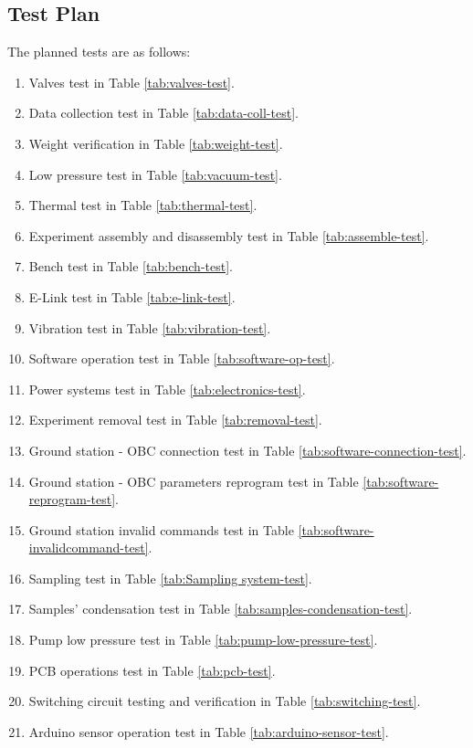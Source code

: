 \pagebreak
\subsection{Test Plan}

The planned tests are as follows:

\begin{enumerate}
    \item Valves test in Table \ref{tab:valves-test}.
    \item Data collection test in Table \ref{tab:data-coll-test}.
    \item Weight verification in Table \ref{tab:weight-test}.
    \item Low pressure test in Table \ref{tab:vacuum-test}.
    \item Thermal test in Table \ref{tab:thermal-test}.
    \item Experiment assembly and disassembly test in Table \ref{tab:assemble-test}.
    \item Bench test in Table \ref{tab:bench-test}.
    \item E-Link test in Table \ref{tab:e-link-test}.
    \item Vibration test in Table \ref{tab:vibration-test}.
    \item Software operation test in Table \ref{tab:software-op-test}.
    \item Power systems test in Table \ref{tab:electronics-test}.
    \item Experiment removal test in Table \ref{tab:removal-test}.
    \item Ground station - OBC connection test in Table \ref{tab:software-connection-test}.
    \item Ground station - OBC parameters reprogram test in Table \ref{tab:software-reprogram-test}.
    \item Ground station invalid commands test in Table \ref{tab:software-invalidcommand-test}.
    \item Sampling test in Table \ref{tab:Sampling system-test}.
    \item Samples' condensation test in Table \ref{tab:samples-condensation-test}.
    \item Pump low pressure test in Table \ref{tab:pump-low-pressure-test}.
    \item PCB operations test in Table \ref{tab:pcb-test}.
    \item Switching circuit testing and verification in Table \ref{tab:switching-test}.
    \item Arduino sensor operation test in Table \ref{tab:arduino-sensor-test}.

\end{enumerate}
